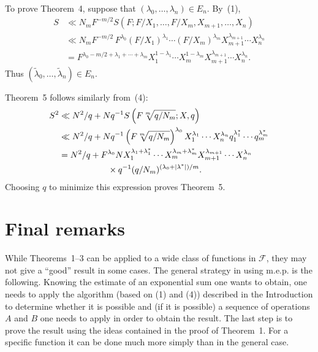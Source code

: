 \documentclass[10pt]{article}
\begin{document}
To prove Theorem~4, suppose that $(\lambda_0,\ldots,\lambda_n)\in E_n$. By~(1),
\[
\begin{aligned}
  S&\ll N_mF^{-m/2}
  S(F;F/X_1,\ldots,F/X_m,X_{m+1},\ldots,X_n)\\
  &\ll N_mF^{-m/2}\,
  F^{\lambda_0}(F/X_1)^{\lambda_1}\cdots(F/X_m)^{\lambda_m}
  X_{m+1}^{\lambda_{m+1}}\cdots X_n^{\lambda_n}\\
  &=F^{\lambda_0-m/2+\lambda_1+\cdots+\lambda_m}
  X_1^{1-\lambda_1}\cdots X_m^{1-\lambda_m}
  X_{m+1}^{\lambda_{m+1}}\cdots X_n^{\lambda_n}.
\end{aligned}
\]
Thus $(\widetilde\lambda_0,\ldots,\widetilde\lambda_n)\in E_n$.

Theorem~5 follows similarly from~(4):
\[
\begin{aligned}
  S^2
  &\ll N^2/q+Nq^{-1}S\left(F\sqrt[m]{q/N_m};X,q\right)\\
  &\ll N^2/q+Nq^{-1}
  \left(F\sqrt[m]{q/N_m}\right)^{\lambda_0}
  X_1^{\lambda_1}\cdots X_n^{\lambda_n}
  q_1^{\lambda_1^*}\cdots q_m^{\lambda_m^*}\\
  &=N^2/q+F^{\lambda_0}N
  X_1^{\lambda_1+\lambda_1^*}\cdots X_m^{\lambda_m+\lambda_m^*}
  X_{m+1}^{\lambda_{m+1}}\cdots X_n^{\lambda_n}\\
  &\hspace{20mm}\times q^{-1}(q/N_m)^{(\lambda_0+|\lambda^*|)/m}.
\end{aligned}
\]
Choosing $q$ to minimize this expression proves Theorem~5.

\section{Final remarks}

While Theorems~1--3 can be applied to a wide class of functions in $\mathscr F$, they may not give a ``good'' result in some cases. The general strategy in using m.e.p. is the following. Knowing the estimate of an exponential sum one wants to obtain, one needs to apply the algorithm (based on (1) and (4)) described in the Introduction to determine whether it is possible and (if it is possible) a sequence of operations $A$ and $B$ one needs to apply in order to obtain the result. The last step is to prove the result using the ideas contained in the proof of Theorem~1. For a specific function it can be done much more simply than in the general case.
\end{document}
